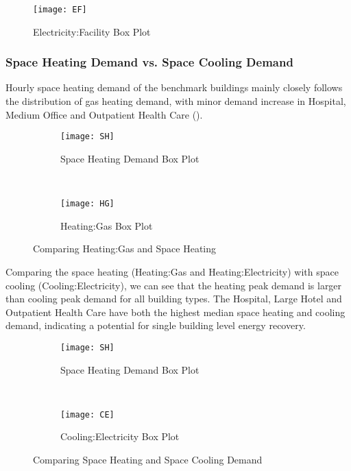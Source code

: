 \begin{figure}[h!]
  \centering
  \texttt{[image: EF]}
  \caption[Electricity:Facility Box Plot]{Electricity:Facility Box
    Plot}
  \label{fig:EF}
\end{figure}%

\subsubsection{Space Heating Demand vs. Space Cooling Demand}
Hourly space heating demand of the benchmark buildings mainly closely
follows the distribution of gas heating demand, with minor demand
increase in Hospital, Medium Office and Outpatient Health Care
().

\begin{figure}[h!]
  \centering
  \begin{subfigure}{0.4\textwidth}
  \centering
  \texttt{[image: SH]}
  \caption[Space Heating Demand Box Plot]{Space Heating Demand Box
    Plot}
  \label{fig:SH}
\end{subfigure}
~
\begin{subfigure}{0.4\textwidth}
  \centering
  \texttt{[image: HG]}
  \caption[Heating:Gas Box Plot]{Heating:Gas Box Plot}
  \label{fig:HG2}
\end{subfigure}
\caption[Comparing Heating:Gas and Space Heating]{Comparing
  Heating:Gas and Space Heating}
\end{figure}

Comparing the space heating (Heating:Gas and Heating:Electricity) with
space cooling (Cooling:Electricity), we can see that the heating peak
demand is larger than cooling peak demand for all building types. The
Hospital, Large Hotel and Outpatient Health Care have both the highest
median space heating and cooling demand, indicating a potential for
single building level energy recovery.
\begin{figure}[h!]
  \centering
  \begin{subfigure}{0.4\textwidth}
  \centering
  \texttt{[image: SH]}
  \caption[Space Heating Demand Box Plot]{Space Heating Demand Box
    Plot}
  \label{fig:SH}
\end{subfigure}
~
\begin{subfigure}{0.4\textwidth}
  \centering
  \texttt{[image: CE]}
  \caption[Cooling:Electricity Box Plot]{Cooling:Electricity Box Plot}
  \label{fig:CE2}
\end{subfigure}
\caption[Comparing Space Heating and Space Cooling Demand]{Comparing
  Space Heating and Space Cooling Demand}
\end{figure}

